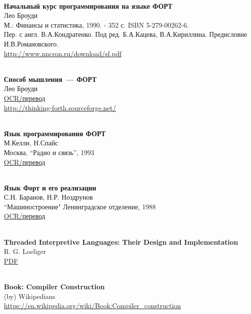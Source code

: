 \begin{thebibliography}{99}
\clearpage
{}\ \\
\textbf{Начальный курс программирования на языке ФОРТ}\\
Лео Броуди \\
М.: Финансы и статистика, 1990. - 352 с.  ISBN 5-279-00262-6.\\
Пер. с англ. В.А.Кондратенко. Под ред. Б.А.Кацева, В.А.Кириллина. Предисловие
И.В.Романовского.\\
\url{http://www.nncron.ru/download/sf.pdf}

\clearpage
{}\ \\
\textbf{Способ мышления\ --- ФОРТ}\\
Лео Броуди \\
\href{http://www.forth.org.ru/~cactus/files/brodie.rar}{OCR/перевод}\\
\url{http://thinking-forth.sourceforge.net/}

\clearpage
{}\ \\
\textbf{Язык программирования ФОРТ}\\
М.Келли, Н.Спайс\\
Москва, ``Радио и связь'', 1993\\
\href{http://www.forth.org.ru/~cactus/files/kelly.rar}{OCR/перевод}

\clearpage
{}\ \\
\textbf{Язык Форт и его реализации}\\
С.Н. Баранов, Н.Р. Ноздрунов\\
``Машиностроение" Ленинградское отделение, 1988\\
\href{http://www.forth.org.ru/~cactus/files/baranov2.rar}{OCR/перевод}

\clearpage
{}\ \\
\textbf{Threaded Interpretive Languages: Their Design and Implementation}\\
R. G. Loeliger\\
\href{http://sinclairql.speccy.org/archivo/docs/books/Threaded_interpretive_languages.pdf}{PDF}

\clearpage
{}\ \\
\textbf{Book: Compiler Construction}\\
(by) Wikipedians\\
\url{https://en.wikipedia.org/wiki/Book:Compiler_construction}


\end{thebibliography}
